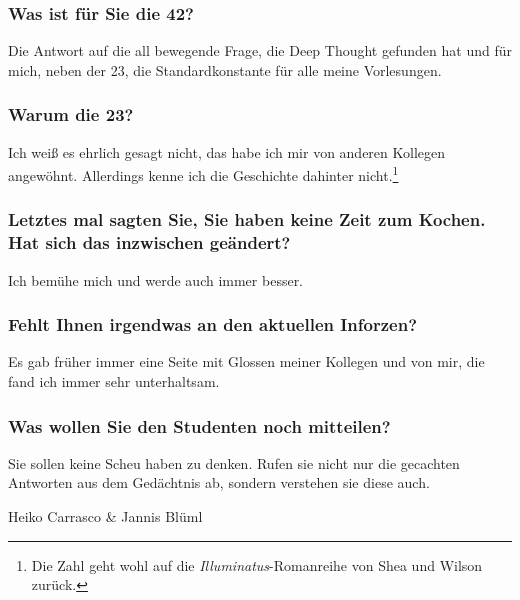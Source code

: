 {\subsubsection{Was ist für Sie die 42?}
Die Antwort auf die all bewegende Frage, die Deep Thought gefunden hat und für mich, neben der 23, die Standardkonstante für alle meine Vorlesungen.

\subsubsection{Warum die 23?}
Ich weiß es ehrlich gesagt nicht, das habe ich mir von anderen Kollegen angewöhnt. Allerdings kenne ich die Geschichte dahinter nicht.\footnote{Die Zahl geht wohl auf die {\em Illuminatus}-Romanreihe von Shea und Wilson zurück.}

\subsubsection{Letztes mal sagten Sie, Sie haben keine Zeit zum Kochen. Hat sich das inzwischen geändert?}
Ich bemühe mich und werde auch immer besser.

\subsubsection{Fehlt Ihnen irgendwas an den aktuellen Inforzen?}
Es gab früher immer eine Seite mit Glossen meiner Kollegen und von mir, die fand ich immer sehr unterhaltsam.

\subsubsection{Was wollen Sie den Studenten noch mitteilen?}
Sie sollen keine Scheu haben zu denken. Rufen sie nicht nur die gecachten Antworten aus dem Gedächtnis ab, sondern verstehen sie diese auch. 	

}
{Heiko Carrasco \& Jannis Blüml}

	\vfill
\begin{minipage}{0.5\textwidth} 
\end{minipage}
\begin{minipage}{0.5\textwidth} 
\end{minipage}

\newpage
